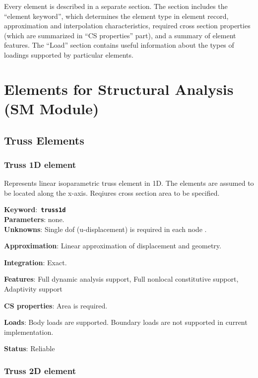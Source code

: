 \documentclass[a4paper]{article}
\newcommand{\descitem}[1]{{\noindent \bf #1}:}
\newcommand{\elemkeyword}[1]{\descitem{Keyword}~{\bf \texttt{#1}}}
\begin{document}
Every element is described in a separate section. The section includes the ``element keyword'', which
determines the element type in element record, approximation and
interpolation characteristics, required cross section properties
(which are summarized in ``CS properties'' part), and a summary of
element features. The ``Load'' section contains useful
information about the types of loadings supported by particular elements.



\section{Elements for Structural Analysis\\(SM Module)}
\subsection{Truss Elements}

\subsubsection{Truss 1D element}
\label{Truss1d}

Represents linear isoparametric truss element in 1D. The elements are
assumed to be located along the x-axis. Reqiures cross section area to be
specified.

\elemkeyword{truss1d}\\
\descitem{Parameters} none.\\
\descitem{Unknowns}
Single dof (u-displacement) is required in each node .

\descitem{Approximation} Linear approximation of displacement and geometry.

\descitem{Integration} Exact.

\descitem{Features} Full dynamic analysis support, Full nonlocal
constitutive support, Adaptivity support

\descitem{CS properties} Area is required.

\descitem{Loads} Body loads are supported. Boundary loads are
not supported in current implementation.

\descitem{Status} Reliable

\subsubsection{Truss 2D element}
\label{Truss2d}
\end{document}
